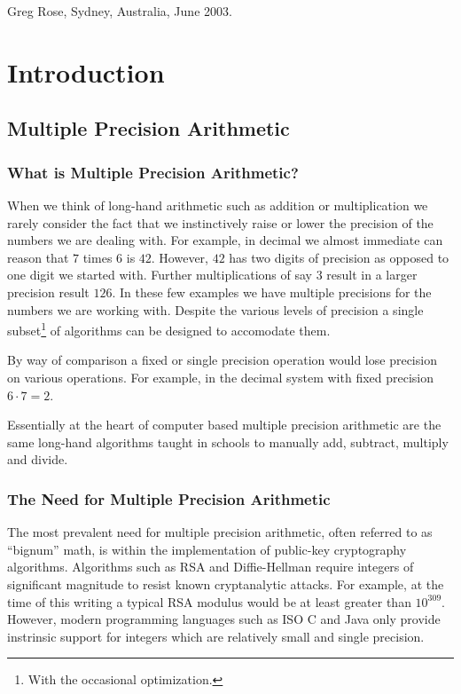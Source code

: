 \documentclass[b5paper]{book}
\begin{document}
\begin{flushright}
Greg Rose, Sydney, Australia, June 2003. 
\end{flushright}

\mainmatter
\pagestyle{headings}
\chapter{Introduction}
\section{Multiple Precision Arithmetic}

\subsection{What is Multiple Precision Arithmetic?}
When we think of long-hand arithmetic such as addition or multiplication we rarely consider the fact that we instinctively
raise or lower the precision of the numbers we are dealing with.  For example, in decimal we almost immediate can 
reason that $7$ times $6$ is $42$.  However, $42$ has two digits of precision as opposed to one digit we started with.  
Further multiplications of say $3$ result in a larger precision result $126$.  In these few examples we have multiple 
precisions for the numbers we are working with.  Despite the various levels of precision a single subset\footnote{With the occasional optimization.}
 of algorithms can be designed to accomodate them.  

By way of comparison a fixed or single precision operation would lose precision on various operations.  For example, in
the decimal system with fixed precision $6 \cdot 7 = 2$.

Essentially at the heart of computer based multiple precision arithmetic are the same long-hand algorithms taught in
schools to manually add, subtract, multiply and divide.  

\subsection{The Need for Multiple Precision Arithmetic}
The most prevalent need for multiple precision arithmetic, often referred to as ``bignum'' math, is within the implementation
of public-key cryptography algorithms.   Algorithms such as RSA \cite{RSAREF} and Diffie-Hellman \cite{DHREF} require 
integers of significant magnitude to resist known cryptanalytic attacks.  For example, at the time of this writing a 
typical RSA modulus would be at least greater than $10^{309}$.  However, modern programming languages such as ISO C \cite{ISOC} and 
Java \cite{JAVA} only provide instrinsic support for integers which are relatively small and single precision.
\end{document}

